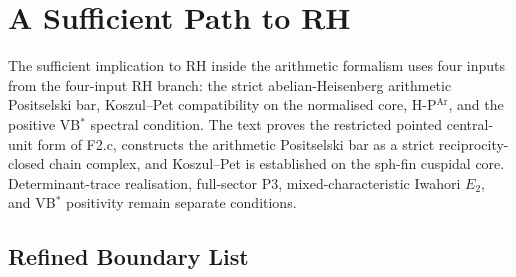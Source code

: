 \section{A Sufficient Path to RH}
\label{v4-arith:app:C:sufficient-path}

The sufficient implication to RH inside the arithmetic formalism uses
four inputs from the four-input RH branch: the strict abelian-Heisenberg arithmetic
Positselski bar, Koszul--Pet compatibility on the normalised core,
H-P\(^{\mathrm{Ar}}\), and the positive VB\(^{*}\) spectral condition. The
text proves the restricted pointed central-unit form of F2.c, constructs
the arithmetic Positselski bar as a strict reciprocity-closed chain complex, and
Koszul--Pet is established on the sph-fin cuspidal core.
Determinant-trace realisation, full-sector P3,
mixed-characteristic Iwahori \(E_{2}\), and
VB\(^{*}\) positivity remain separate conditions.

\subsection{Refined Boundary List}
\label{v4-arith:app:C:residual-list-w2}

